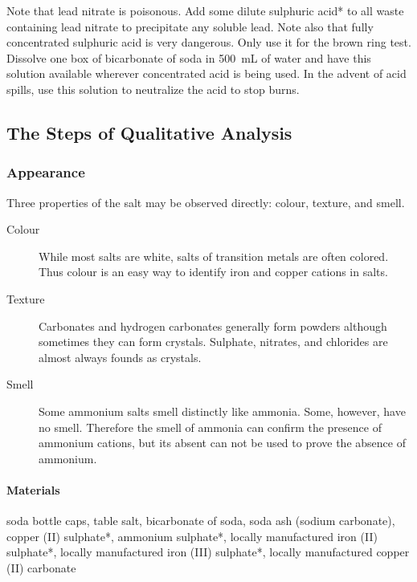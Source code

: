 Note that lead nitrate is poisonous. Add some dilute sulphuric acid* to all waste containing lead nitrate to precipitate any soluble lead. Note also that fully concentrated sulphuric acid is very dangerous. Only use it for the brown ring test. Dissolve one box of bicarbonate of soda in 500~mL of water and have this solution available wherever concentrated acid is being used. In the advent of acid spills, use this solution to neutralize the acid to stop burns.


\subsection{The Steps of Qualitative Analysis}
\setcounter{secnumdepth}{3}
\subsubsection{Appearance}

Three properties of the salt may be observed directly: colour, texture, and smell.
\begin{description}

\item[Colour]{While most salts are white, salts of transition metals are often colored. Thus colour is an easy way to identify iron and copper cations in salts.}

\item[Texture]{Carbonates and hydrogen carbonates generally form powders although sometimes they can form crystals. Sulphate, nitrates, and chlorides are almost always founds as crystals.}

\item[Smell]{Some ammonium salts smell distinctly like ammonia. Some, however, have no smell. Therefore the smell of ammonia can confirm the presence of ammonium cations, but its absent can not be used to prove the absence of ammonium.}

\end{description}

\paragraph{Materials}
soda bottle caps, table salt, bicarbonate of soda, soda ash (sodium carbonate), copper (II) sulphate*, ammonium sulphate*, locally manufactured iron (II) sulphate*, locally manufactured iron (III) sulphate*, locally manufactured copper (II) carbonate

